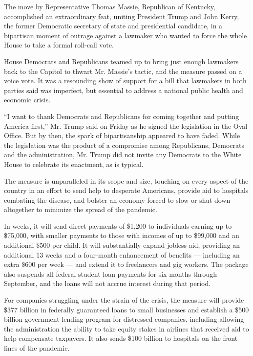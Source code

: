 The move by Representative Thomas Massie, Republican of Kentucky,
accomplished an extraordinary feat, uniting President Trump and John
Kerry, the former Democratic secretary of state and presidential
candidate, in a bipartisan moment of outrage against a lawmaker who
wanted to force the whole House to take a formal roll-call vote.

House Democrats and Republicans teamed up to bring just enough lawmakers
back to the Capitol to thwart Mr. Massie's tactic, and the measure
passed on a voice vote. It was a resounding show of support for a bill
that lawmakers in both parties said was imperfect, but essential to
address a national public health and economic crisis.

``I want to thank Democrats and Republicans for coming together and
putting America first,'' Mr. Trump said on Friday as he signed the
legislation in the Oval Office. But by then, the spark of bipartisanship
appeared to have faded. While the legislation was the product of a
compromise among Republicans, Democrats and the administration, Mr.
Trump did not invite any Democrats to the White House to celebrate its
enactment, as is typical.

The measure is unparalleled in its scope and size, touching on every
aspect of the country in an effort to send help to desperate Americans,
provide aid to hospitals combating the disease, and bolster an economy
forced to slow or shut down altogether to minimize the spread of the
pandemic.

In weeks, it will send direct payments of \$1,200 to individuals earning
up to \$75,000, with smaller payments to those with incomes of up to
\$99,000 and an additional \$500 per child. It will substantially expand
jobless aid, providing an additional 13 weeks and a four-month
enhancement of benefits --- including an extra \$600 per week --- and
extend it to freelancers and gig workers. The package also suspends all
federal student loan payments for six months through September, and the
loans will not accrue interest during that period.

For companies struggling under the strain of the crisis, the measure
will provide \$377 billion in federally guaranteed loans to small
businesses and establish a \$500 billion government lending program for
distressed companies, including allowing the administration the ability
to take equity stakes in airlines that received aid to help compensate
taxpayers. It also sends \$100 billion to hospitals on the front lines
of the pandemic.

